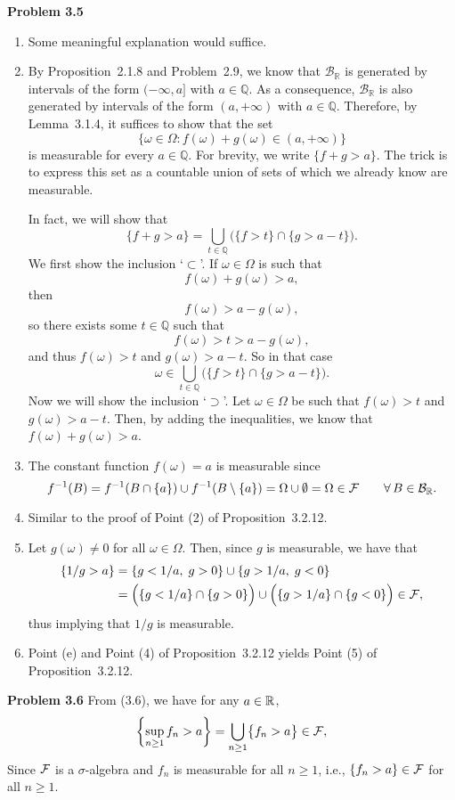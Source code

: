 \textbf{Problem 3.5}
\begin{enumerate}[label=(\alph*)]
	\item Some meaningful explanation would suffice.
	
	\item By Proposition~2.1.8 and Problem~2.9, we know that $\mathcal{B}_\mathbb{R}$ is generated by intervals of the form $(-\infty,a]$ with $a \in \mathbb{Q}$. 
As a consequence, $\mathcal{B}_\mathbb{R}$ is also generated by intervals of the form $(a, +\infty)$ with $a \in \mathbb{Q}$.
Therefore, by Lemma~3.1.4, it suffices to show that the set
\[
	\bigl\{ \omega \in \Omega : f(\omega) + g(\omega) \in (a,+\infty) \bigr\}
\]
is measurable for every $a \in \mathbb{Q}$. For brevity, we write $\{ f + g > a\}$. The trick is to express this set as a countable union of sets of which we already know are measurable.

In fact, we will show that
\[
	\{ f + g > a\} = \bigcup_{t \in \mathbb{Q}} \Big(\{ f > t \} \cap \{ g > a - t  \} \Big).
\]
We first show the inclusion `$\subset$'. If $\omega \in \Omega$ is such that
\[
	f(\omega) + g(\omega) > a,
\]
then 
\[
	f(\omega) > a - g(\omega),
\]
so there exists some $t \in \mathbb{Q}$ such that
\[
	f(\omega) > t > a - g(\omega),
\]
and thus $f(\omega) > t$ and $g(\omega) > a - t$.
So in that case
\[
	\omega \in \bigcup_{t \in \mathbb{Q}}\Big(\{ f > t \} \cap \{ g > a - t  \}\Big).
\]
Now we will show the inclusion `$\supset$'. 
Let $\omega \in \Omega$ be such that $f(\omega) > t$ and $g(\omega) > a - t$. 
Then, by adding the inequalities, we know that $f(\omega) + g(\omega) > a$. 

	\item The constant function $f(\omega)=a$ is measurable since 
	\[
		f^{-1}(B) = f^{-1}(B\cap\{a\})\cup f^{-1}(B\setminus \{a\}) = \Omega\cup \emptyset = \Omega\in \mathcal F\qquad\forall\,B\in\mathcal B_{\mathbb R}.
	\]
	
	\item Similar to the proof of Point (2) of Proposition~3.2.12.
	\item Let $g(\omega)\ne 0$ for all $\omega\in\Omega$. Then, since $g$ is measurable, we have that
	\begin{align*}
		\{ 1/g > a\} &= \{ g < 1/a,\;g>0\}\cup \{ g > 1/a,\; g<0\} \\
		&= \Bigl(\{ g < 1/a\}\cap \{g>0\}\Bigr) \cup \Bigl(\{ g > 1/a\}\cap\{g<0\}\Bigr) \in \mathcal F,
	\end{align*}
	thus implying that $1/g$ is measurable.
	
	\item Point (e) and Point (4) of Proposition~3.2.12 yields Point (5) of Proposition~3.2.12.
\end{enumerate}

\bigskip

\textbf{Problem 3.6} 
From (3.6), we have for any $a\in\mathbb R$,
\[
	\left\{ \sup_{n\ge 1} f_n>a\right\} = \bigcup_{n\ge 1} \bigl\{ f_n>a\bigr\}\in\mathcal F,
\]
Since $\mathcal F$ is a $\sigma$-algebra and $f_n$ is measurable for all $n\ge 1$, i.e., $\{f_n>a\}\in\mathcal F$ for all $n\ge 1$.




